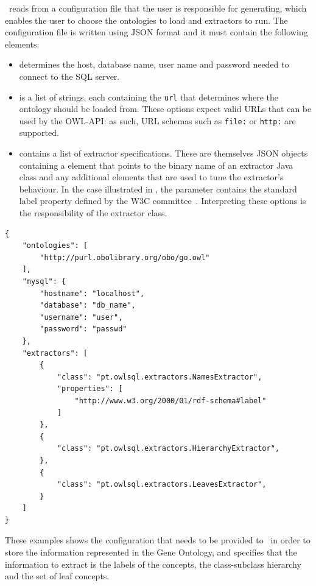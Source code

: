\owlsql\ reads from a configuration file that the user is responsible for generating, which enables the user to choose the ontologies to load and extractors to run. The configuration file is written using JSON format and it must contain the following elements:
\begin{itemize}
    \item {} determines the host, database name, user name and password needed to connect to the SQL server.
    
    \item {} is a list of strings, each containing the \texttt{url} that determines where the ontology should be loaded from. These options expect valid URLs that can be used by the OWL-API: as such, URL schemas such as \texttt{file:} or \texttt{http:} are supported.
    
    \item {} contains a list of extractor specifications. These are themselves JSON objects containing a  element that points to the binary name of an extractor Java class and any additional elements that are used to tune the extractor's behaviour. In the case illustrated in , the parameter  contains the standard label property defined by the W3C committee~\citep{Guha2014}. Interpreting these options is the responsibility of the extractor class.
\end{itemize}

\begin{listing}
\centering
\begin{verbatim}
{
    "ontologies": [
        "http://purl.obolibrary.org/obo/go.owl"
    ],
    "mysql": {
        "hostname": "localhost",
        "database": "db_name",
        "username": "user",
        "password": "passwd"
    },
    "extractors": [
        {
            "class": "pt.owlsql.extractors.NamesExtractor",
            "properties": [
                "http://www.w3.org/2000/01/rdf-schema#label"
            ]
        },
        {
            "class": "pt.owlsql.extractors.HierarchyExtractor",
        },
        {
            "class": "pt.owlsql.extractors.LeavesExtractor",
        }
    ]
}
\end{verbatim}
\caption[A possible \owlsql\ configuration file]{These examples shows the configuration that needs to be provided to \owlsql\ in order to store the information represented in the Gene Ontology, and specifies that the information to extract is the labels of the concepts, the class-subclass hierarchy and the set of leaf concepts.}
\label{lst:owlsql-config}
\end{listing}

